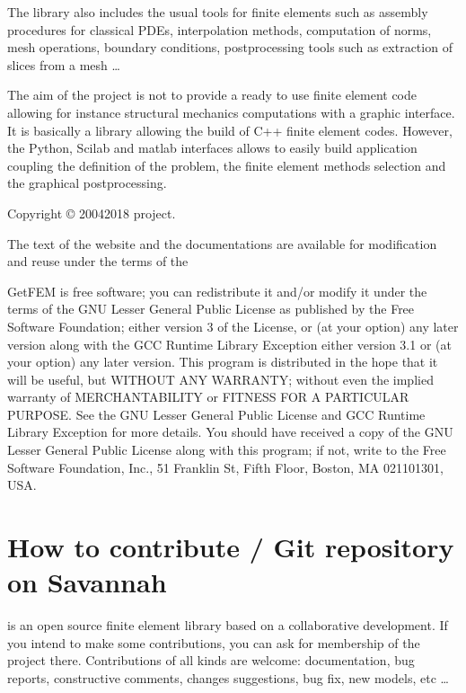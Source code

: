 \documentclass[a4paper,11pt,english]{sphinxmanual}
\begin{document}
The library also includes the usual tools for finite elements such as assembly
procedures for classical PDEs, interpolation methods, computation of norms,
mesh operations, boundary conditions, post\sphinxhyphen{}processing tools such as
extraction of slices from a mesh …

The aim of the  project is not to provide a ready to use
finite element code allowing for instance structural mechanics
computations with a graphic interface. It is basically a library
allowing the build of C++  finite element codes.
However, the Python, Scilab and matlab interfaces allows to easily build application
coupling the definition of the problem, the finite element methods
selection and the graphical post\sphinxhyphen{}processing.

Copyright © 2004\sphinxhyphen{}2018  project.

The text of the  website and the documentations are available for modification and reuse under the terms of the 

GetFEM  is  free software;  you  can  redistribute  it  and/or modify it
under  the  terms  of the  GNU  Lesser General Public License as published
by  the  Free Software Foundation;  either version 3 of the License,  or
(at your option) any later version along with the GCC Runtime Library
Exception either version 3.1 or (at your option) any later version.
This program  is  distributed  in  the  hope  that it will be useful,  but
WITHOUT ANY WARRANTY; without even the implied warranty of MERCHANTABILITY
or  FITNESS  FOR  A PARTICULAR PURPOSE.  See the GNU Lesser General Public
License and GCC Runtime Library Exception for more details.
You  should  have received a copy of the GNU Lesser General Public License
along  with  this program;  if not, write to the Free Software Foundation,
Inc., 51 Franklin St, Fifth Floor, Boston, MA  02110\sphinxhyphen{}1301, USA.


\chapter{How to contribute / Git repository on Savannah}
\label{\detokenize{project/contribute:how-to-contribute-git-repository-on-savannah}}\label{\detokenize{project/contribute:dp-contribute}}\label{\detokenize{project/contribute::doc}}
 is an  open source finite element library based on a collaborative development. If you intend to make some contributions, you can ask for membership of the project there. Contributions of all kinds are welcome: documentation, bug reports, constructive comments, changes suggestions, bug fix, new models, etc …
\end{document}

